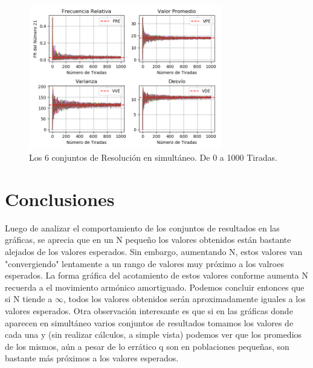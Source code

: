 \documentclass[a4paper]{article}
\begin{document}
\begin{figure}[H]
    \centering
    \includegraphics[width=0.75\textwidth]{./graphs/multi_graph_iterations_1000.png}
    \caption{\label{fig:img6}Los 6 conjuntos de Resolución en simultáneo. De 0 a 1000 Tiradas.}
\end{figure}


\section{Conclusiones}
\label{sec:conclusiones}
Luego de analizar el comportamiento de los conjuntos de resultados en las gráficas, se aprecia que en un N pequeño los valores obtenidos están bastante alejados de los valores esperados. Sin embargo, aumentando N, estos valores van "convergiendo" lentamente a un rango de valores muy próximo a los valroes esperados. La forma gráfica del acotamiento de estos valores conforme aumenta N recuerda a el movimiento armónico amortiguado.
\bigskip
\newline
Podemos concluir entonces que si N tiende a \(\infty\), todos los valores obtenidos serán aproximadamente iguales a los valores esperados.
\bigskip
\newline
Otra observación interesante es que si en las gráficas donde aparecen en simultáneo varios conjuntos de resultados tomamos los valores de cada una y (sin realizar cálculos, a simple vista) podemos ver que los promedios de los mismos, aún a pesar de lo errático q son en poblaciones pequeñas, son bastante más próximos a los valores esperados.
\end{document}
